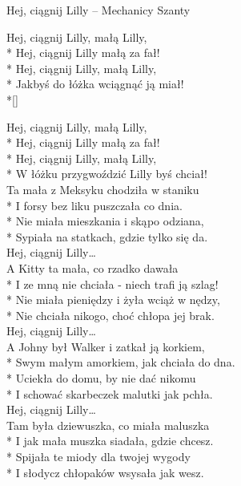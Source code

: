 \begin{piosenka_dluga}{Hej, ciągnij Lilly -- Mechanicy Szanty}

 Hej, ciągnij Lilly, małą Lilly, \\*
 Hej, ciągnij Lilly małą za fał! \\*
 Hej, ciągnij Lilly, małą Lilly, \\*
 Jakbyś do łóżka wciągnąć ją miał! \\*[\zwrotkaspace]

 Hej, ciągnij Lilly, małą Lilly, \\*
 Hej, ciągnij Lilly małą za fał! \\*
 Hej, ciągnij Lilly, małą Lilly, \\*
 W łóżku przygwoździć Lilly byś chciał! \\[\zwrotkaspace]

Ta mała z Meksyku chodziła w staniku \\*
I forsy bez liku puszczała co dnia. \\*
Nie miała mieszkania i skąpo odziana, \\*
Sypiała na statkach, gdzie tylko się da. \\[\zwrotkaspace]

 Hej, ciągnij Lilly\ldots \\[\zwrotkaspace]

A Kitty ta mała, co rzadko dawała \\*
I ze mną nie chciała - niech trafi ją szlag! \\*
Nie miała pieniędzy i żyła wciąż w nędzy, \\*
Nie chciała nikogo, choć chłopa jej brak. \\[\zwrotkaspace]

 Hej, ciągnij Lilly\ldots \\[\zwrotkaspace]

A Johny był Walker i zatkał ją korkiem, \\*
Swym małym amorkiem, jak chciała do dna. \\*
Uciekła do domu, by nie dać nikomu \\*
I schować skarbeczek malutki jak pchła. \\[\zwrotkaspace]

 Hej, ciągnij Lilly\ldots \\[\zwrotkaspace]

Tam była dziewuszka, co miała maluszka \\*
I jak mała muszka siadała, gdzie chcesz. \\*
Spijała te miody dla twojej wygody \\*
I słodycz chłopaków wsysała jak wesz. \\[\zwrotkaspace]


\end{piosenka_dluga}
